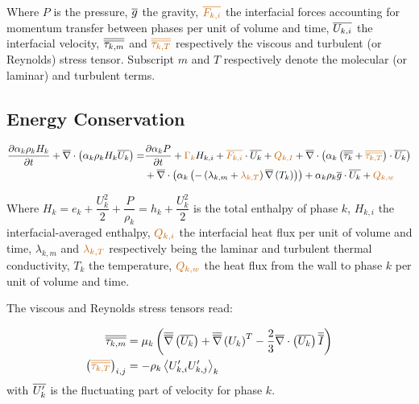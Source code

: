 Where $P$ is the pressure, $\overline{g}$ the gravity, $\orangemath{ \vect{F_{k,i}} }$ the interfacial forces accounting for momentum transfer between phases per unit of volume and time, $\overline{U_{k,i}}$ the interfacial velocity, $\overline{\overline{\tau_{k,m}}}$ and $\orangemath{ \tens{\tau_{k,T}} }$ respectively the viscous and turbulent (or Reynolds) stress tensor. Subscript $m$ and $T$ respectively denote the molecular (or laminar) and turbulent terms.


\subsection{Energy Conservation}

\begin{equation}
\begin{aligned}
	\dtime{\alpha_{k}\rho_{k} H_{k}} + \divg{\alpha_{k}\rho_{k} H_{k}\vect{U_{k}}} =& \dtime{\alpha_{k}P} + \orangemath{\Gamma_{k}}H_{k,i}+\orangemath{\vect{F_{k,i}}}\cdot \vect{U_{k}} + \orangemath{Q_{k,I}} + \divg{\alpha_{k}\parth{ \tens{\tau_{k}} + \orangemath{\tens{\tau_{k,T}}} }\cdot \vect{U_{k}}}\\
	& + \divg{\alpha_{k} \parth{-\parth{ \lambda_{k,m}+\orangemath{\lambda_{k,T}}}\grad{T_{k}}}} + \alpha_{k}\rho_{k}\vect{g}\cdot \vect{U_{k}} + \orangemath{Q_{k,w}}
\end{aligned}
\label{eq:energy}
\end{equation}

Where $H_{k}=e_{k}+\dfrac{U_{k}^{2}}{2}+\dfrac{P}{\rho_{k}}=h_{k}+\dfrac{U_{k}^{2}}{2}$ is the total enthalpy of phase $k$, $H_{k,i}$ the interfacial-averaged enthalpy, $\orangemath{ Q_{k,i} }$ the interfacial heat flux per unit of volume and time, $\lambda_{k,m}$ and $\orangemath{ \lambda_{k,T} }$ respectively being the laminar and turbulent thermal conductivity, $T_{k}$ the temperature, $\orangemath{ Q_{k,w} }$ the heat flux from the wall to phase $k$ per unit of volume and time.

\npar

The viscous and Reynolds stress tensors read:

\begin{align}
\tens{\tau_{k,m}} &= \mu_{k} \parth{ \vecgrad{\vect{U_{k}}}+\vecgrad{U_{k}}^{T}  - \frac{2}{3}\divg{\vect{U_{k}}}\tens{I} }\\
\parth{\orangemath{\tens{\tau_{k,T}}} }_{i,j} &= -\rho_{k} \left< U'_{k,i}U'_{k,j} \right>_{k}
\end{align}
with $\overline{U'_{k}}$ is the fluctuating part of velocity for phase $k$.


